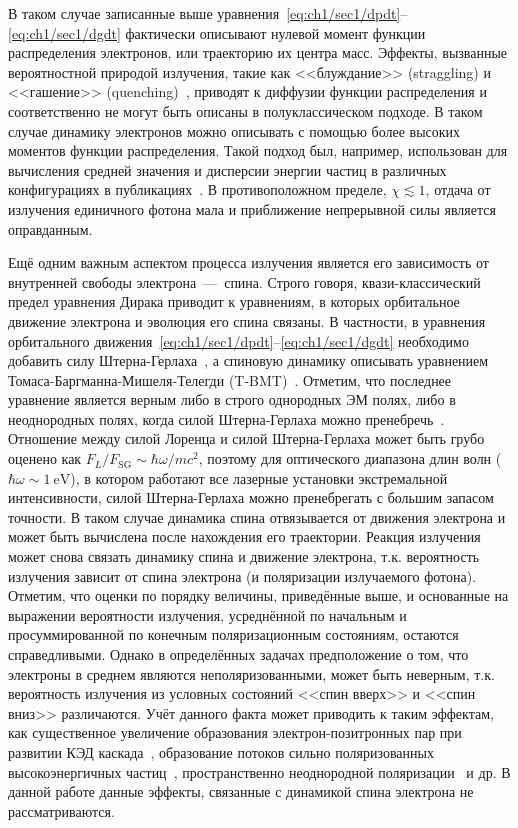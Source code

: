 В таком случае записанные выше уравнения~\eqref{eq:ch1/sec1/dpdt}--\eqref{eq:ch1/sec1/dgdt} фактически описывают нулевой момент функции распределения электронов, или траекторию их центра масс.
Эффекты, вызванные вероятностной природой излучения, такие как <<блуждание>> (straggling) и <<гашение>> (quenching)~\cite{shen1972energy, duclous2010monte, harvey2017quantum, gonoskov2021charged}, приводят к диффузии функции распределения и соответственно не могут быть описаны в полуклассическом подходе.
В таком случае динамику электронов можно описывать с помощью более высоких моментов функции распределения.
Такой подход был, например, использован для вычисления средней значения и дисперсии энергии частиц в различных конфигурациях в публикациях~\cite{neitz2013stochasticity, ridgers2017signatures, niel2018quantum}.
В противоположном пределе, $\chi \lesssim 1$, отдача от излучения единичного фотона мала и приближение непрерывной силы является оправданным.

Ещё одним важным аспектом процесса излучения является его зависимость от внутренней свободы электрона~---~спина.
Строго говоря, квази-классический предел уравнения Дирака приводит к уравнениям, в которых орбитальное движение электрона и эволюция его спина связаны.
В частности, в уравнения орбитального движения~\eqref{eq:ch1/sec1/dpdt}--\eqref{eq:ch1/sec1/dgdt} необходимо добавить силу Штерна-Герлаха~\cite{gerlach1922experimentelle}, а спиновую динамику описывать уравнением Томаса-Баргманна-Мишеля-Телегди (T-BMT)~\cite{thomas1926motion, bargmann1959precession}.
Отметим, что последнее уравнение является верным либо в строго однородных ЭМ полях, либо в неоднородных полях, когда силой Штерна-Герлаха можно пренебречь~\cite{mane2005spin}.
Отношение между силой Лоренца и силой Штерна-Герлаха может быть грубо оценено как $F_L/F_\mathrm{SG}\!\!\sim\!\!\hbar\omega/mc^2$, поэтому для оптического диапазона длин волн ($\hbar\omega\!\!\!\sim\!\!\!\SI{1}{\electronvolt}$), в котором работают все лазерные установки экстремальной интенсивности, силой Штерна-Герлаха можно пренебрегать с большим запасом точности.
В таком случае динамика спина отвязывается от движения электрона и может быть вычислена после нахождения его траектории.
Реакция излучения может снова связать динамику спина и движение электрона, т.к. вероятность излучения зависит от спина электрона (и поляризации излучаемого фотона).
Отметим, что оценки по порядку величины, приведённые выше, и основанные на выражении вероятности излучения, усреднённой по начальным и просуммированной по конечным поляризационным состояниям, остаются справедливыми.
Однако в определённых задачах предположение о том, что электроны в среднем являются неполяризованными, может быть неверным, т.к. вероятность излучения из условных состояний <<спин вверх>> и <<спин вниз>> различаются.
Учёт данного факта может приводить к таким эффектам, как существенное увеличение образования электрон-позитронных пар при развитии КЭД каскада~\cite{Seipt2021PolarizedQEDcascad}, образование потоков сильно поляризованных высокоэнергичных частиц~\cite{wen2019polarized, li2019ultrarelativistic}, пространственно неоднородной поляризации~\cite{gong2021retrieving} и др.
В данной работе данные эффекты, связанные с динамикой спина электрона не рассматриваются.

